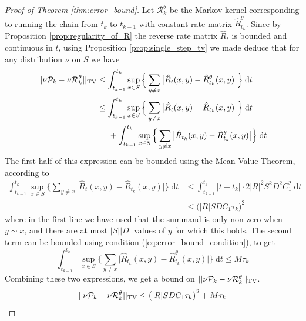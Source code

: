 \documentclass{article}
\begin{document}
\begin{proof}[Proof of Theorem \ref{thm:error_bound}]
Let $\mathcal{R}_k^\theta$ be the Markov kernel corresponding to running the chain from $t_k$ to $t_{k-1}$ with constant rate matrix $\hat R^\theta_{t_k}$. Since by Proposition \ref{prop:regularity_of_R} the reverse rate matrix $\hat R_t$ is bounded and continuous in $t$, using Proposition \ref{prop:single_step_tv} we made deduce that for any distribution $\nu$ on $S$ we have
\begin{align}
    ||\nu \mathcal{P}_k - \nu \mathcal{R}_k^\theta||_{\textup{TV}} &\leq \int_{t_{k-1}}^{t_k} \sup_{x \in S} \Big\{ \sum_{y \neq x} \big| \hat R_t(x,y) - \hat R^\theta_{t_k}(x,y) \big| \Big\} \; \mathrm{d} t \\
    &\leq \int_{t_{k-1}}^{t_k} \sup_{x \in S} \Big\{ \sum_{y \neq x} \big| \hat R_t(x,y) - \hat R_{t_k}(x,y) \big| \Big\} \; \mathrm{d} t  \\
    &\hspace{5mm} + \int_{t_{k-1}}^{t_k} \sup_{x \in S} \Big\{ \sum_{y \neq x} \big| \hat R_{t_k}(x,y) - \hat R^\theta_{t_k}(x,y) \big| \Big\} \; \mathrm{d} t
\end{align}
The first half of this expression can be bounded using the Mean Value Theorem, according to
\begin{align}
    \int_{t_{k-1}}^{t_k} \sup_{x \in S} \Big\{ \sum_{y \neq x} \big| \hat R_t(x,y) - \hat R_{t_k}(x,y) \big| \Big\} \; \mathrm{d} t &\leq \int_{t_{k-1}}^{t_k} |t - t_k| \cdot 2|R|^2S^2D^2C_1^2 \; \mathrm{d} t \\
    &\leq \big(|R|SDC_1\tau_k\big)^2
\end{align}
where in the first line we have used that the summand is only non-zero when $y \sim x$, and there are at most $|S||D|$ values of $y$ for which this holds. The second term can be bounded using condition (\ref{eq:error_bound_condition}), to get 
\begin{equation}
    \int_{t_{k-1}}^{t_k} \sup_{x \in S} \Big\{ \sum_{y \neq x} \big| \hat R_{t_k}(x,y) - \hat R^\theta_{t_k}(x,y) \big| \Big\} \; \mathrm{d} t \leq M \tau_k
\end{equation}
Combining these two expressions, we get a bound on $||\nu \mathcal{P}_k - \nu \mathcal{R}_k^\theta||_{\textup{TV}}$.
\begin{equation}
    ||\nu \mathcal{P}_k - \nu \mathcal{R}_k^\theta||_{\textup{TV}} \leq \big(|R|SDC_1\tau_k\big)^2 + M\tau_k
\end{equation}


\end{proof}
\end{document}
